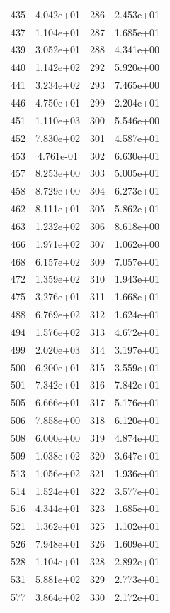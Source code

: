 \documentclass[12pt]{article}
\begin{document}
\begin{longtable}{@{}cccc@{}}
435 & 4.042e+01 & 286 & 2.453e+01 \\
437 & 1.104e+01 & 287 & 1.685e+01 \\
439 & 3.052e+01 & 288 & 4.341e+00 \\
440 & 1.142e+02 & 292 & 5.920e+00 \\
441 & 3.234e+02 & 293 & 7.465e+00 \\
446 & 4.750e+01 & 299 & 2.204e+01 \\
451 & 1.110e+03 & 300 & 5.546e+00 \\
452 & 7.830e+02 & 301 & 4.587e+01 \\
453 & 4.761e-01 & 302 & 6.630e+01 \\
457 & 8.253e+00 & 303 & 5.005e+01 \\
458 & 8.729e+00 & 304 & 6.273e+01 \\
462 & 8.111e+01 & 305 & 5.862e+01 \\
463 & 1.232e+02 & 306 & 8.618e+00 \\
466 & 1.971e+02 & 307 & 1.062e+00 \\
468 & 6.157e+02 & 309 & 7.057e+01 \\
472 & 1.359e+02 & 310 & 1.943e+01 \\
475 & 3.276e+01 & 311 & 1.668e+01 \\
488 & 6.769e+02 & 312 & 1.624e+01 \\
494 & 1.576e+02 & 313 & 4.672e+01 \\
499 & 2.020e+03 & 314 & 3.197e+01 \\
500 & 6.200e+01 & 315 & 3.559e+01 \\
501 & 7.342e+01 & 316 & 7.842e+01 \\
505 & 6.666e+01 & 317 & 5.176e+01 \\
506 & 7.858e+00 & 318 & 6.120e+01 \\
508 & 6.000e+00 & 319 & 4.874e+01 \\
509 & 1.038e+02 & 320 & 3.647e+01 \\
513 & 1.056e+02 & 321 & 1.936e+01 \\
514 & 1.524e+01 & 322 & 3.577e+01 \\
516 & 4.344e+01 & 323 & 1.685e+01 \\
521 & 1.362e+01 & 325 & 1.102e+01 \\
526 & 7.948e+01 & 326 & 1.609e+01 \\
528 & 1.104e+01 & 328 & 2.892e+01 \\
531 & 5.881e+02 & 329 & 2.773e+01 \\
577 & 3.864e+02 & 330 & 2.172e+01 \\

\end{longtable}
\end{document}
